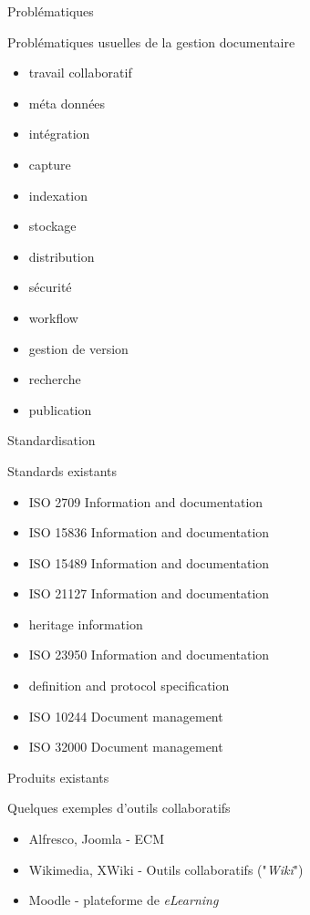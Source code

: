 
\begin{frame}{Problématiques}
  \begin{block}{Problématiques usuelles de la gestion documentaire}
    \begin{itemize}
      \item travail collaboratif
      \item méta données
      \item intégration
      \item capture
      \item indexation
      \item stockage
      \item distribution
      \item sécurité
      \item workflow
      \item gestion de version
      \item recherche
      \item publication
   \end{itemize}
 \end{block}
\end{frame}

\begin{frame}{Standardisation}
  \begin{block}{Standards existants}
    \begin{itemize}
      \item ISO 2709 Information and documentation
      \item ISO 15836 Information and documentation
      \item ISO 15489 Information and documentation
      \item ISO 21127 Information and documentation
      \item heritage information
      \item ISO 23950 Information and documentation
      \item definition and protocol specification
      \item ISO 10244 Document management
      \item ISO 32000 Document management
    \end{itemize}
  \end{block}
\end{frame}

\begin{frame}{Produits existants}
  \begin{block}{Quelques exemples d'outils collaboratifs}
    \begin{itemize}
      \item Alfresco, Joomla - ECM
      \item Wikimedia, XWiki - Outils collaboratifs ("\textit{Wiki}")
      \item Moodle - plateforme de \textit{eLearning}
    \end{itemize}
  \end{block}
\end{frame}
